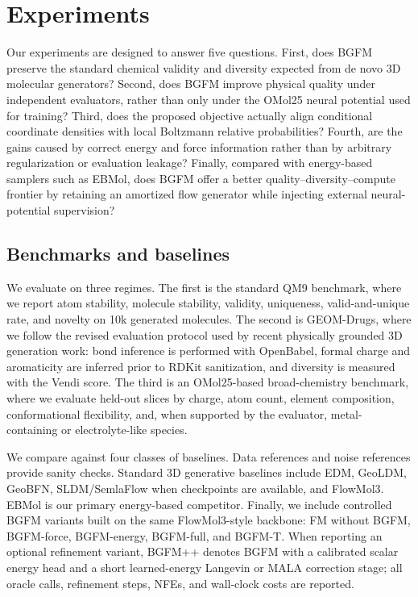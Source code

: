 \section{Experiments}
\label{sec:experiments}

Our experiments are designed to answer five questions. First, does BGFM preserve the standard chemical validity and diversity expected from de novo 3D molecular generators? Second, does BGFM improve physical quality under independent evaluators, rather than only under the OMol25 neural potential used for training? Third, does the proposed objective actually align conditional coordinate densities with local Boltzmann relative probabilities? Fourth, are the gains caused by correct energy and force information rather than by arbitrary regularization or evaluation leakage? Finally, compared with energy-based samplers such as EBMol, does BGFM offer a better quality--diversity--compute frontier by retaining an amortized flow generator while injecting external neural-potential supervision?

\subsection{Benchmarks and baselines}

We evaluate on three regimes. The first is the standard QM9 benchmark, where we report atom stability, molecule stability, validity, uniqueness, valid-and-unique rate, and novelty on 10k generated molecules. The second is GEOM-Drugs, where we follow the revised evaluation protocol used by recent physically grounded 3D generation work: bond inference is performed with OpenBabel, formal charge and aromaticity are inferred prior to RDKit sanitization, and diversity is measured with the Vendi score. The third is an OMol25-based broad-chemistry benchmark, where we evaluate held-out slices by charge, atom count, element composition, conformational flexibility, and, when supported by the evaluator, metal-containing or electrolyte-like species.

We compare against four classes of baselines. Data references and noise references provide sanity checks. Standard 3D generative baselines include EDM, GeoLDM, GeoBFN, SLDM/SemlaFlow when checkpoints are available, and FlowMol3. EBMol is our primary energy-based competitor. Finally, we include controlled BGFM variants built on the same FlowMol3-style backbone: FM without BGFM, BGFM-force, BGFM-energy, BGFM-full, and BGFM-T. When reporting an optional refinement variant, BGFM++ denotes BGFM with a calibrated scalar energy head and a short learned-energy Langevin or MALA correction stage; all oracle calls, refinement steps, NFEs, and wall-clock costs are reported.

